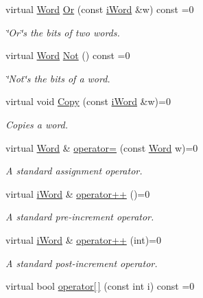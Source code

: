 \begin{DoxyCompactItemize}
virtual \hyperlink{classWord}{Word} \hyperlink{classiWord_a2f57b8b8739d1ce6c043494696a9f685}{Or} (const \hyperlink{classiWord}{iWord} \&w) const =0
\begin{DoxyCompactList}\small\item\em \char`\"{}Or\char`\"{}s the bits of two words. \item\end{DoxyCompactList}\item 
virtual \hyperlink{classWord}{Word} \hyperlink{classiWord_a6a7602a8220d84b5201a789b597fbbde}{Not} () const =0
\begin{DoxyCompactList}\small\item\em \char`\"{}Not\char`\"{}s the bits of a word. \item\end{DoxyCompactList}\item 
virtual void \hyperlink{classiWord_ac5ca71cd1defb94cd1f3536a59612a4e}{Copy} (const \hyperlink{classiWord}{iWord} \&w)=0
\begin{DoxyCompactList}\small\item\em Copies a word. \item\end{DoxyCompactList}\item 
virtual \hyperlink{classWord}{Word} \& \hyperlink{classiWord_a56d5d0a8d7e27cf8ef161f8e128ace83}{operator=} (const \hyperlink{classWord}{Word} w)=0
\begin{DoxyCompactList}\small\item\em A standard assignment operator. \item\end{DoxyCompactList}\item 
virtual \hyperlink{classiWord}{iWord} \& \hyperlink{classiWord_af20040c25b79d2aeae41f1714fbb2cbc}{operator++} ()=0
\begin{DoxyCompactList}\small\item\em A standard pre-\/increment operator. \item\end{DoxyCompactList}\item 
virtual \hyperlink{classiWord}{iWord} \& \hyperlink{classiWord_a6777f6f41915179c4255d3647a9eb4b5}{operator++} (int)=0
\begin{DoxyCompactList}\small\item\em A standard post-\/increment operator. \item\end{DoxyCompactList}\item 
virtual bool \hyperlink{classiWord_a0e83901b08763247527ce61c89fd847f}{operator\mbox{[}$\,$\mbox{]}} (const int i) const =0

\end{DoxyCompactItemize}
